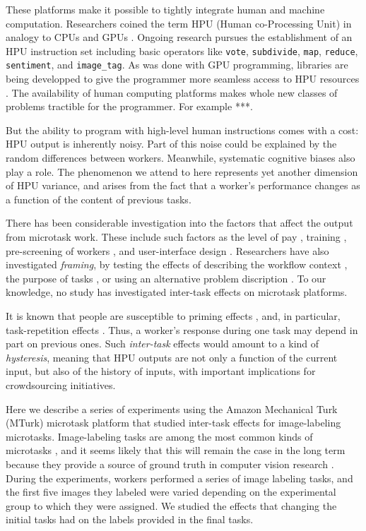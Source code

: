 \documentclass[12pt]{article}
\begin{document}
These platforms make it possible to tightly integrate human and 
machine computation.  Researchers coined the term HPU 
(Human co-Processing Unit) in analogy to CPUs and GPUs \cite{5543192}.  
Ongoing research pursues the establishment of an HPU instruction set
including basic operators like \texttt{vote}, \texttt{subdivide}, \texttt{map},
\texttt{reduce}, \texttt{sentiment}, and \texttt{image\_tag}.  As was 
done with GPU programming, libraries are being developped to give the 
programmer more seamless access to HPU resources 
 \cite{little2010turkit,minder2011crowdlang,minder2012crowdlang,kittur2011crowdforge}.  The availability of human computing platforms makes whole new classes
of problems tractible for the programmer.  For example ***.

But the ability to program with high-level human instructions comes with a 
cost: HPU output is inherently noisy.  Part of this noise could be 
explained by the random differences between workers.  Meanwhile, systematic 
cognitive biases also play a role.  
The phenomenon we attend to here represents yet
another dimension of HPU variance, and arises from the fact that a worker's 
performance changes as a function of the content of previous tasks.  

There has been considerable investigation into the factors that affect the 
output from microtask work.  These include such factors as the 
level of 
pay \cite{kazai2013analysis}, training \cite{le2010ensuring}, pre-screening of 
workers \cite{paolacci2010running}, and user-interface design 
\cite{Finnerty2013}.  Researchers have also investigated \textit{framing}, 
by testing the effects of describing the workflow context 
\cite{Kinnaird2012281}, the purpose of tasks 
\cite{chandler2013breaking}, or using an alternative problem discription
\cite{thibodeau2013natural}.  To our knowledge, no study has investigated 
inter-task effects on microtask platforms.

It is known that people are susceptible to priming effects 
\cite{BJOP1796,No2007,beller1971priming}, and, in particular, task-repetition 
effects \cite{Gass1999549,sohn2001task}.  Thus, a worker's response during
one task may depend in part on previous ones.  Such \textit{inter-task} effects
would amount to a kind of \textit{hysteresis}, meaning that HPU outputs are not
only a function of the current input, but also of the history of inputs, with
important implications for crowdsourcing initiatives.

Here we describe a series of experiments using the Amazon Mechanical
Turk (MTurk) microtask platform that studied inter-task effects
for image-labeling microtasks.  Image-labeling tasks are among the most 
common kinds of microtasks
\cite{chandler2013breaking,Berinsky2012351,Finnerty2013,paolacci2010running}, 
and it seems likely that this will remain the case in the long term because
they provide a source of ground truth in computer vision research 
\cite{5543192}.  
During the experiments, workers performed a series of image labeling tasks, 
and the first five images
they labeled were varied depending on the experimental group to which they
were assigned.  We studied the effects that changing the initial tasks 
had on the labels provided in the final tasks.
\end{document}
